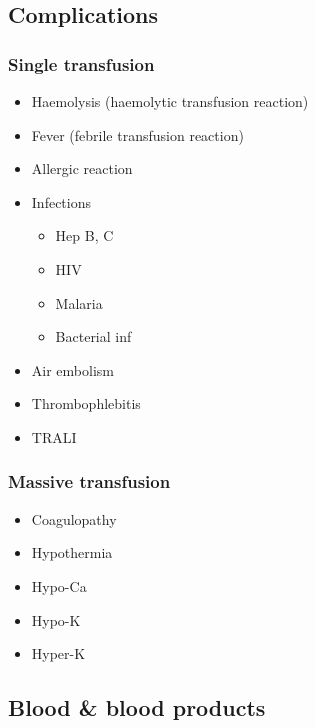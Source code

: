 \documentclass[
  14pt,
]{extarticle}
\providecommand{\tightlist}{%
  \setlength{\itemsep}{0pt}\setlength{\parskip}{0pt}}
\begin{document}
\hypertarget{complications}{%
\subsection{Complications}\label{complications}}

\hypertarget{single-transfusion}{%
\subsubsection{Single transfusion}\label{single-transfusion}}

\begin{itemize}
\tightlist
\item
  Haemolysis (haemolytic transfusion reaction)
\item
  Fever (febrile transfusion reaction)
\item
  Allergic reaction
\item
  Infections

  \begin{itemize}
  \tightlist
  \item
    Hep B, C
  \item
    HIV
  \item
    Malaria
  \item
    Bacterial inf
  \end{itemize}
\item
  Air embolism
\item
  Thrombophlebitis
\item
  TRALI
\end{itemize}

\hypertarget{massive-transfusion}{%
\subsubsection{Massive transfusion}\label{massive-transfusion}}

\begin{itemize}
\tightlist
\item
  Coagulopathy
\item
  Hypothermia
\item
  Hypo-Ca
\item
  Hypo-K
\item
  Hyper-K
\end{itemize}

\hypertarget{blood-blood-products}{%
\subsection{Blood \& blood products}\label{blood-blood-products}}
\end{document}
